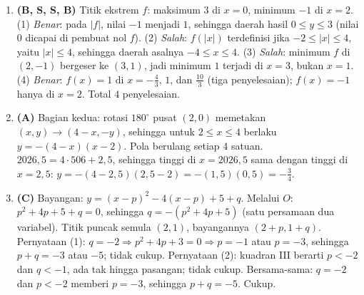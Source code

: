 \documentclass[a4paper,11pt]{article}
\newcounter{no}
\begin{document}
\begin{enumerate}[leftmargin=2em,itemsep=2pt,topsep=2pt]
\item[\textbf{18.}] \textbf{(B, S, S, B)} Titik ekstrem $f$: maksimum $3$ di $x=0$, minimum $-1$ di $x=2$. (1) \emph{Benar}: pada $|f|$, nilai $-1$ menjadi $1$, sehingga daerah hasil $0\le y\le3$ (nilai $0$ dicapai di pembuat nol $f$). (2) \emph{Salah}: $f(|x|)$ terdefinisi jika $-2\le|x|\le4$, yaitu $|x|\le4$, sehingga daerah asalnya $-4\le x\le4$. (3) \emph{Salah}: minimum $f$ di $(2,-1)$ bergeser ke $(3,1)$, jadi minimum $1$ terjadi di $x=3$, bukan $x=1$. (4) \emph{Benar}: $f(x)=1$ di $x=-\frac43$, $1$, dan $\frac{10}3$ (tiga penyelesaian); $f(x)=-1$ hanya di $x=2$. Total $4$ penyelesaian.
\item[\textbf{19.}] \textbf{(A)} Bagian kedua: rotasi $180^\circ$ pusat $(2,0)$ memetakan $(x,y)\to(4-x,-y)$, sehingga untuk $2\le x\le4$ berlaku $y=-(4-x)(x-2)$. Pola berulang setiap $4$ satuan. $2026{,}5=4\cdot506+2{,}5$, sehingga tinggi di $x=2026{,}5$ sama dengan tinggi di $x=2{,}5$: $y=-(4-2{,}5)(2{,}5-2)=-(1{,}5)(0{,}5)=-\frac34$.
\item[\textbf{20.}] \textbf{(C)} Bayangan: $y=(x-p)^2-4(x-p)+5+q$. Melalui $O$: $p^2+4p+5+q=0$, sehingga $q=-(p^2+4p+5)$ (satu persamaan dua variabel). Titik puncak semula $(2,1)$, bayangannya $(2+p,1+q)$. Pernyataan (1): $q=-2\Rightarrow p^2+4p+3=0\Rightarrow p=-1$ atau $p=-3$, sehingga $p+q=-3$ atau $-5$; tidak cukup. Pernyataan (2): kuadran III berarti $p<-2$ dan $q<-1$, ada tak hingga pasangan; tidak cukup. Bersama-sama: $q=-2$ dan $p<-2$ memberi $p=-3$, sehingga $p+q=-5$. Cukup.
\end{enumerate}
\par{}\par\vspace{0.2em}
\end{document}
